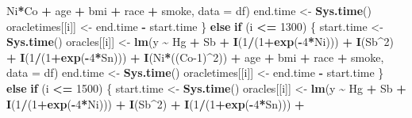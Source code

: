 \documentclass[12pt, twoside]{amherstthesis}
\newenvironment{Shaded}{\begin{snugshade}}{\end{snugshade}}
\newcommand{\AttributeTok}[1]{\textcolor[rgb]{0.13,0.29,0.53}{#1}}
\newcommand{\ControlFlowTok}[1]{\textcolor[rgb]{0.13,0.29,0.53}{\textbf{#1}}}
\newcommand{\DecValTok}[1]{\textcolor[rgb]{0.00,0.00,0.81}{#1}}
\newcommand{\FunctionTok}[1]{\textcolor[rgb]{0.13,0.29,0.53}{\textbf{#1}}}
\newcommand{\NormalTok}[1]{#1}
\newcommand{\OtherTok}[1]{\textcolor[rgb]{0.56,0.35,0.01}{#1}}
\newcommand{\SpecialCharTok}[1]{\textcolor[rgb]{0.81,0.36,0.00}{\textbf{#1}}}
\begin{document}
\begin{Shaded}
\begin{Highlighting}[]
\NormalTok{                           Ni}\SpecialCharTok{*}\NormalTok{Co }\SpecialCharTok{+} 
\NormalTok{                           age }\SpecialCharTok{+}\NormalTok{ bmi }\SpecialCharTok{+}\NormalTok{ race }\SpecialCharTok{+}\NormalTok{ smoke, }\AttributeTok{data =}\NormalTok{ df)}
\NormalTok{      end.time }\OtherTok{\textless{}{-}} \FunctionTok{Sys.time}\NormalTok{()}
\NormalTok{      oracletimes[[i]] }\OtherTok{\textless{}{-}}\NormalTok{ end.time }\SpecialCharTok{{-}}\NormalTok{ start.time}
\NormalTok{    \} }\ControlFlowTok{else} \ControlFlowTok{if}\NormalTok{ (i }\SpecialCharTok{\textless{}=} \DecValTok{1300}\NormalTok{) \{}
\NormalTok{      start.time }\OtherTok{\textless{}{-}} \FunctionTok{Sys.time}\NormalTok{()}
\NormalTok{      oracles[[i]] }\OtherTok{\textless{}{-}} \FunctionTok{lm}\NormalTok{(y }\SpecialCharTok{\textasciitilde{}}\NormalTok{ Hg }\SpecialCharTok{+}\NormalTok{ Sb }\SpecialCharTok{+}
                           \FunctionTok{I}\NormalTok{(}\DecValTok{1}\SpecialCharTok{/}\NormalTok{(}\DecValTok{1}\SpecialCharTok{+}\FunctionTok{exp}\NormalTok{(}\SpecialCharTok{{-}}\DecValTok{4}\SpecialCharTok{*}\NormalTok{Ni))) }\SpecialCharTok{+} \FunctionTok{I}\NormalTok{(Sb}\SpecialCharTok{\^{}}\DecValTok{2}\NormalTok{) }\SpecialCharTok{+} \FunctionTok{I}\NormalTok{(}\DecValTok{1}\SpecialCharTok{/}\NormalTok{(}\DecValTok{1}\SpecialCharTok{+}\FunctionTok{exp}\NormalTok{(}\SpecialCharTok{{-}}\DecValTok{4}\SpecialCharTok{*}\NormalTok{Sn))) }\SpecialCharTok{+}
                           \FunctionTok{I}\NormalTok{(Ni}\SpecialCharTok{*}\NormalTok{((Co}\DecValTok{{-}1}\NormalTok{)}\SpecialCharTok{\^{}}\DecValTok{2}\NormalTok{)) }\SpecialCharTok{+} 
\NormalTok{                           age }\SpecialCharTok{+}\NormalTok{ bmi }\SpecialCharTok{+}\NormalTok{ race }\SpecialCharTok{+}\NormalTok{ smoke, }\AttributeTok{data =}\NormalTok{ df)}
\NormalTok{      end.time }\OtherTok{\textless{}{-}} \FunctionTok{Sys.time}\NormalTok{()}
\NormalTok{      oracletimes[[i]] }\OtherTok{\textless{}{-}}\NormalTok{ end.time }\SpecialCharTok{{-}}\NormalTok{ start.time}
\NormalTok{    \} }\ControlFlowTok{else} \ControlFlowTok{if}\NormalTok{ (i }\SpecialCharTok{\textless{}=} \DecValTok{1500}\NormalTok{) \{}
\NormalTok{      start.time }\OtherTok{\textless{}{-}} \FunctionTok{Sys.time}\NormalTok{()}
\NormalTok{      oracles[[i]] }\OtherTok{\textless{}{-}} \FunctionTok{lm}\NormalTok{(y }\SpecialCharTok{\textasciitilde{}}\NormalTok{ Hg }\SpecialCharTok{+}\NormalTok{ Sb }\SpecialCharTok{+}
                           \FunctionTok{I}\NormalTok{(}\DecValTok{1}\SpecialCharTok{/}\NormalTok{(}\DecValTok{1}\SpecialCharTok{+}\FunctionTok{exp}\NormalTok{(}\SpecialCharTok{{-}}\DecValTok{4}\SpecialCharTok{*}\NormalTok{Ni))) }\SpecialCharTok{+} \FunctionTok{I}\NormalTok{(Sb}\SpecialCharTok{\^{}}\DecValTok{2}\NormalTok{) }\SpecialCharTok{+} \FunctionTok{I}\NormalTok{(}\DecValTok{1}\SpecialCharTok{/}\NormalTok{(}\DecValTok{1}\SpecialCharTok{+}\FunctionTok{exp}\NormalTok{(}\SpecialCharTok{{-}}\DecValTok{4}\SpecialCharTok{*}\NormalTok{Sn))) }\SpecialCharTok{+}

\end{Highlighting}
\end{Shaded}
\end{document}
